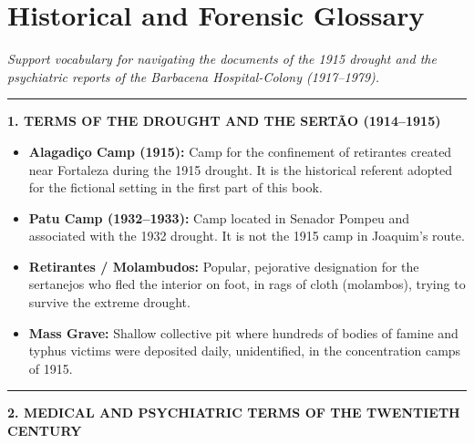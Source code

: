 \cleardoublepage
\thispagestyle{empty}
\chapter*{Historical and Forensic Glossary}

\begingroup

\noindent\textit{Support vocabulary for navigating the documents of the 1915 drought and the psychiatric reports of the Barbacena Hospital-Colony (1917--1979).}

\vspace{0.8em}
\noindent\rule{\textwidth}{0.8pt}
\vspace{0.6em}

\noindent\textbf{1. TERMS OF THE DROUGHT AND THE SERTÃO (1914--1915)}

\vspace{0.4em}
\begin{itemize}[itemsep=0.2em]
  \item \textbf{Alagadiço Camp (1915):} Camp for the confinement of retirantes created near Fortaleza during the 1915 drought. It is the historical referent adopted for the fictional setting in the first part of this book.
  \item \textbf{Patu Camp (1932--1933):} Camp located in Senador Pompeu and associated with the 1932 drought. It is not the 1915 camp in Joaquim's route.
  \item \textbf{Retirantes / Molambudos:} Popular, pejorative designation for the sertanejos who fled the interior on foot, in rags of cloth (molambos), trying to survive the extreme drought.
  \item \textbf{Mass Grave:} Shallow collective pit where hundreds of bodies of famine and typhus victims were deposited daily, unidentified, in the concentration camps of 1915.
\end{itemize}

\vspace{0.8em}
\noindent\rule{\textwidth}{0.5pt}
\vspace{0.6em}

\noindent\textbf{2. MEDICAL AND PSYCHIATRIC TERMS OF THE TWENTIETH CENTURY}

